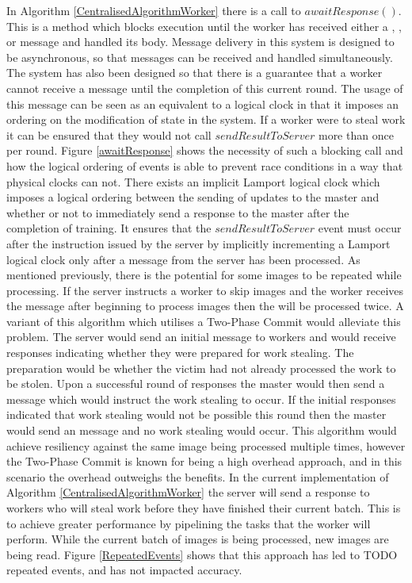 \documentclass[12pt]{article}
\begin{document}
In Algorithm \ref{CentralisedAlgorithmWorker} there is a call to $awaitResponse()$. This is a method which blocks execution until the worker has received either a , , or  message and handled its body. Message delivery in this system is designed to be asynchronous, so that messages can be received and handled simultaneously. The system has also been designed so that there is a guarantee that a worker cannot receive a  message until the completion of this current round. The usage of this message can be seen as an equivalent to a logical clock in that it imposes an ordering on the modification of state in the system. If a worker were to steal work it can be ensured that they would not call $sendResultToServer$ more than once per round. Figure \ref{awaitResponse} shows the necessity of such a blocking call and how the logical ordering of events is able to prevent race conditions in a way that physical clocks can not.
\newline
There exists an implicit Lamport logical clock which imposes a logical ordering between the sending of updates to the master and whether or not to immediately send a response to the master after the completion of training. It ensures that the $sendResultToServer$ event must occur after the instruction issued by the server by implicitly incrementing a Lamport logical clock only after a message from the server has been processed.
\newline
As mentioned previously, there is the potential for some images to be repeated while processing. If the server instructs a worker to skip images and the worker receives the message after beginning to process images then the will be processed twice. A variant of this algorithm which utilises a Two-Phase Commit would alleviate this problem. The server would send an initial  message to workers and would receive responses indicating whether they were prepared for work stealing. The preparation would be whether the victim had not already processed the work to be stolen. Upon a successful round of responses the master would then send a  message which would instruct the work stealing to occur. If the initial responses indicated that work stealing would not be possible this round then the master would send an  message and no work stealing would occur.
\newline
This algorithm would achieve resiliency against the same image being processed multiple times, however the Two-Phase Commit is known for being a high overhead approach, and in this scenario the overhead outweighs the benefits.
\newline
In the current implementation of Algorithm \ref{CentralisedAlgorithmWorker} the server will send a response to workers who will steal work before they have finished their current batch. This is to achieve greater performance by pipelining the tasks that the worker will perform. While the current batch of images is being processed, new images are being read. Figure \ref{RepeatedEvents} shows that this approach has led to TODO repeated events, and has not impacted accuracy.
\end{document}
